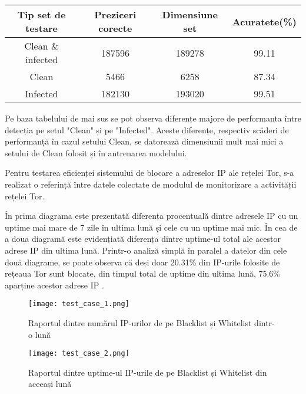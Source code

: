 \begin{center}
	\begin{tabular}{||c c c c||} 
		\hline
		Tip set de testare  & Preziceri corecte & Dimensiune set & Acuratete(\%) \\ [0.5ex] 
		\hline\hline
		Clean \& infected & 187596 & 189278 & 99.11 \\ 
		\hline
		Clean & 5466 & 6258 & 87.34 \\
		\hline
		Infected & 182130 & 193020 & 99.51 \\
		\hline
	\end{tabular}
\end{center}

Pe baza tabelului de mai sus se pot observa diferențe majore de performanta între detecția pe setul "Clean" și pe "Infected". Aceste diferențe, respectiv scăderi de performanță în cazul setului Clean, se datorează dimensiunii mult mai mici a setului de Clean folosit și în antrenarea modelului. 

Pentru testarea eficienței sistemului de blocare a adreselor IP ale rețelei Tor, s-a realizat o referință între datele colectate de modulul de monitorizare a activității rețelei Tor. 

În prima diagrama este prezentată diferența procentuală dintre adresele IP cu un uptime mai mare de 7 zile în ultima lună și cele cu un uptime mai mic. În cea de a doua diagramă este evidențiată diferența dintre uptime-ul total ale acestor adrese IP din ultima lună. Printr-o analiză simplă în paralel a datelor din cele două diagrame, se poate observa că deși doar 20.31\% din IP-urile folosite de rețeaua Tor sunt blocate, din timpul total de uptime din ultima lună, 75.6\% aparține acestor adrese IP .

\begin{figure}
	\centering
	\texttt{[image: test\_case\_1.png]}
	\caption{ Raportul dintre numărul IP-urilor de pe Blacklist și Whitelist dintr-o lună }
	\label{fig:test_1}
\end{figure}

\begin{figure}
	\centering
	\texttt{[image: test\_case\_2.png]}
	\caption{ Raportul dintre uptime-ul IP-urile de pe Blacklist și Whitelist din aceeași lună }
	\label{fig:test_2}
\end{figure}


\newpage

